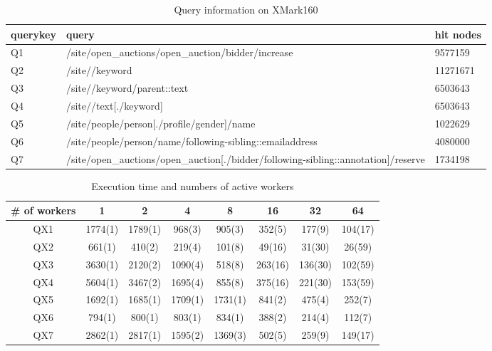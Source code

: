 \begin{table}[]
\centering
\caption{Query information on XMark160}
\label{}
\begin{tabular}{|l|l|l|}
\hline
querykey & query                                                                                  & hit nodes \\ \hline
Q1       & /site/open\_auctions/open\_auction/bidder/increase                                     & 9577159   \\ \hline
Q2       & /site//keyword                                                                         & 11271671  \\ \hline
Q3       & /site//keyword/parent::text                                                            & 6503643   \\ \hline
Q4       & /site//text{[}./keyword{]}                                                             & 6503643   \\ \hline
Q5       & /site/people/person{[}./profile/gender{]}/name                                         & 1022629   \\ \hline
Q6       & /site/people/person/name/following-sibling::emailaddress                               & 4080000   \\ \hline
Q7       & /site/open\_auctions/open\_auction{[}./bidder/following-sibling::annotation{]}/reserve & 1734198   \\ \hline
\end{tabular}
\end{table}




\begin{table}[]
\centering
\caption{Execution time and numbers of active workers}
\label{exetime_worker}
\begin{tabular}{|c|c|c|c|c|c|c|c|}
\hline
\# of workers & 1       & 2       & 4       & 8       & 16      & 32      & 64      \\ \hline
QX1           & 1774(1) & 1789(1) & 968(3)  & 905(3)  & 352(5)  & 177(9)  & 104(17) \\ \hline
QX2           & 661(1)  & 410(2)  & 219(4)  & 101(8)  & 49(16)  & 31(30)  & 26(59)  \\ \hline
QX3           & 3630(1) & 2120(2) & 1090(4) & 518(8)  & 263(16) & 136(30) & 102(59) \\ \hline
QX4           & 5604(1) & 3467(2) & 1695(4) & 855(8)  & 375(16) & 221(30) & 153(59) \\ \hline
QX5           & 1692(1) & 1685(1) & 1709(1) & 1731(1) & 841(2)  & 475(4)  & 252(7)  \\ \hline
QX6           & 794(1)  & 800(1)  & 803(1)  & 834(1)  & 388(2)  & 214(4)  & 112(7)  \\ \hline
QX7           & 2862(1) & 2817(1) & 1595(2) & 1369(3) & 502(5)  & 259(9)  & 149(17) \\ \hline
\end{tabular}
\end{table}